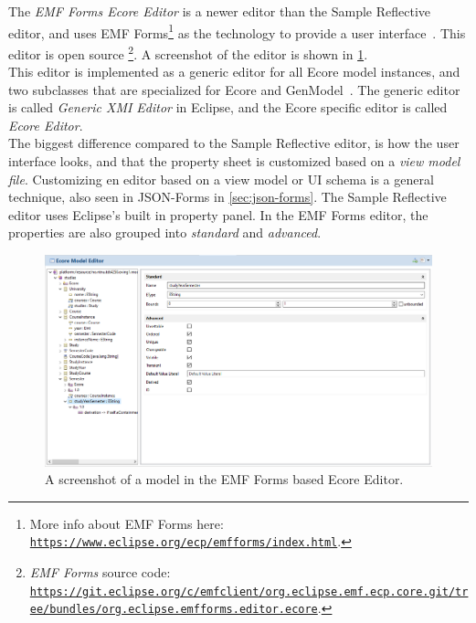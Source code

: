The \textit{EMF Forms Ecore Editor} is a newer editor than the Sample Reflective editor, and uses EMF Forms\footnote{More info about EMF Forms here: \href{https://www.eclipse.org/ecp/emfforms/index.html}{\nolinkurl{https://www.eclipse.org/ecp/emfforms/index.html}}.} as the technology to provide a user interface~\cite{eclipsesourceEMFFormsEditors2016}.
This editor is \gls{open source}%
\footnote{\textit{EMF Forms} source code: \href{https://git.eclipse.org/c/emfclient/org.eclipse.emf.ecp.core.git/tree/bundles/org.eclipse.emfforms.editor.ecore}{\nolinkurl{https://git.eclipse.org/c/emfclient/org.eclipse.emf.ecp.core.git/tree/bundles/org.eclipse.emfforms.editor.ecore}}.}.
A screenshot of the editor is shown in \cref{fig:emf-forms-ecore-editor}.\\

This editor is implemented as a generic editor for all \gls{Ecore} model instances, and two subclasses that are specialized for \gls{Ecore} and GenModel~\cite{eclipsesourceEMFFormsEditors2016}.
The generic editor is called \textit{Generic XMI Editor} in \gls{Eclipse}, and the \gls{Ecore} specific editor is called \textit{Ecore Editor}.\\

The biggest difference compared to the Sample Reflective editor, is how the user interface looks, and that the property sheet is customized based on a \textit{view model file}.
Customizing en editor based on a view model or UI schema is a general technique, also seen in JSON-Forms in \cref{sec:json-forms}.
The Sample Reflective editor uses \gls{Eclipse}'s built in property panel.
In the EMF Forms editor, the properties are also grouped into \textit{standard} and \textit{advanced}.

\begin{figure}[htbp]  %
  \centering
  \includegraphics[width=\textwidth]{figures/pre-project/ecore-eclipse-emf-forms-model-editor.png}
  \caption[EMF Forms Ecore Editor]{A screenshot of a model in the EMF Forms based Ecore Editor.}\label{fig:emf-forms-ecore-editor}
\end{figure}


